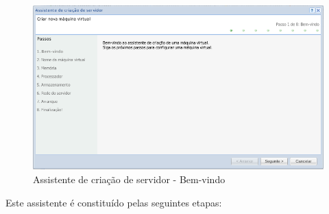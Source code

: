 \begin{figure}[H]
	\begin{center}
	\includegraphics[scale=0.5]{screenshots/server_createwiz.png}
	\caption{Assistente de criação de servidor - Bem-vindo}
	\label{fig:server_createwiz}
	\end{center}
\end{figure}
Este assistente é constituído pelas seguintes etapas:
